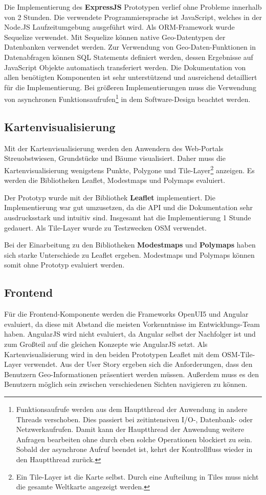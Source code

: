 Die Implementierung des \textbf{ExpressJS} Prototypen verlief ohne Probleme innerhalb von 2 Stunden.
Die verwendete Programmiersprache ist JavaScript, welches in der Node.JS Laufzeitumgebung ausgeführt wird.
Als \ac{ORM}-Framework wurde Sequelize verwendet.
Mit Sequelize können native Geo-Datentypen der Datenbanken verwendet werden.
Zur Verwendung von Geo-Daten-Funktionen in Datenabfragen können SQL Statements definiert werden, dessen Ergebnisse auf JavaScript Objekte automatisch transferiert werden.
Die Dokumentation von allen benötigten Komponenten ist sehr unterstützend und ausreichend detailliert für die Implementierung.
Bei größeren Implementierungen muss die Verwendung von asynchronen Funktionsaufrufen\footnote{Funktionsaufrufe werden aus dem Hauptthread der Anwendung in andere Threads verschoben. Dies passiert bei zeitintensiven I/O-, Datenbank- oder Netzwerkaufrufen.
Damit kann der Hauptthread der Anwendung weitere Anfragen bearbeiten ohne durch eben solche Operationen blockiert zu sein. Sobald der asynchrone Aufruf beendet ist, kehrt der Kontrollfluss wieder in den Hauptthread zurück.} in dem Software-Design beachtet werden.

\subsection{Kartenvisualisierung}
Mit der Kartenvisualisierung werden den Anwendern des Web-Portals Streuobstwiesen, Grundstücke und Bäume visualisiert.
Daher muss die Kartenvisualisierung wenigstens Punkte, Polygone und Tile-Layer\footnote{Ein Tile-Layer ist die Karte selbst. Durch eine Aufteilung in Tiles muss nicht die gesamte Weltkarte angezeigt werden.} anzeigen.
Es werden die Bibliotheken Leaflet, Modestmaps und Polymaps evaluiert.

Der Prototyp wurde mit der Bibliothek \textbf{Leaflet} implementiert.
Die Implementierung war gut umzusetzen, da die API und die Dokumentation sehr ausdrucksstark und intuitiv sind.
Insgesamt hat die Implementierung 1 Stunde gedauert.
Als Tile-Layer wurde zu Testzwecken \ac{OSM} verwendet.

Bei der Einarbeitung zu den Bibliotheken \textbf{Modestmaps} und \textbf{Polymaps} haben sich starke Unterschiede zu Leaflet ergeben.
Modestmaps und Polymaps können somit ohne Prototyp evaluiert werden.

\subsection{Frontend}
Für die Frontend-Komponente werden die Frameworks OpenUI5 und Angular evaluiert, da diese mit Abstand die meisten Vorkenntnisse im Entwicklungs-Team haben.
AngularJS wird nicht evaluiert, da Angular selbst der Nachfolger ist und zum Großteil auf die gleichen Konzepte wie AngularJS setzt.
Als Kartenvisualisierung wird in den beiden Prototypen Leaflet mit dem \ac{OSM}-Tile-Layer verwendet.
Aus der User Story ergeben sich die Anforderungen, dass den Benutzern Geo-Informationen präsentiert werden müssen.
Außerdem muss es den Benutzern möglich sein zwischen verschiedenen Sichten navigieren zu können.

